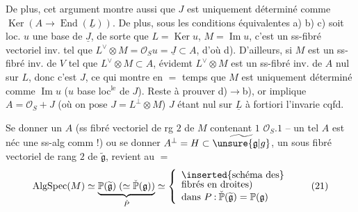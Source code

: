 De plus, cet argument montre aussi que $J$ est uniquement déterminé comme $\operatorname{Ker}(A\to\operatorname{End}(\underline L))$.
De plus, sous les conditions équivalentes a) b) c)  soit loc. $u$ une base de $\underline J$,  de sorte que $L=\operatorname{Ker}u$,  $M=\operatorname{Im}u$, c'est un ss-fibré vectoriel inv. tel que  $L^\vee\otimes M=\mathcal O_Su=\underline J\subset A$, d'où d).
D'ailleurs, si $M$ est un ss-fibré inv. de $V$ tel que $L^\vee\otimes M\subset A$, évidemt $L^\vee\otimes M$ est un ss-fibré inv. de $A$ nul sur $L$, donc c'est $J$, ce qui montre en $=$ temps que $M$ est uniquement déterminé comme $\operatorname{Im}u$ ($u$ base loc$^{\mathrm{le}}$ de $J$).
Reste à prouver d)$\longrightarrow$b), or  implique $A=\mathcal O_S+J$ (où on pose $J=L^\perp\otimes M$)  $J$ étant nul sur  $\underline L$ à fortiori l'invarie cqfd.


Se donner un $A$ (ss fibré vectoriel de rg $2$ de $M$ contenant $1$ $\mathcal O_S.1$ -- un tel $A$ est néc une ss-alg comm !) ou se donner $A^\perp=H\subset\widetilde{\unsure{\mathfrak g|g}}$, un sous fibré vectoriel de rang $2$  de $\widetilde{\mathfrak g}$, revient au $=$
\[
 \operatorname{AlgSpec}(M)\simeq
 \underbrace{\mathbb P(\widetilde{\mathfrak g})\;(\simeq\check{\mathbb P}(\mathfrak g))}_{\check P}
 \simeq\left\{\begin{array}{l}
 \inserted{\text{schéma des}}\\[-2pt]
 \text{fibrés en droites)}\\
 \text{dans }P\mathbin{:}\check{\mathbb P}(\widetilde{\mathfrak g})=\mathbb P(\mathfrak g)
 \end{array}\right.
 \tag*{(21)}
\]
